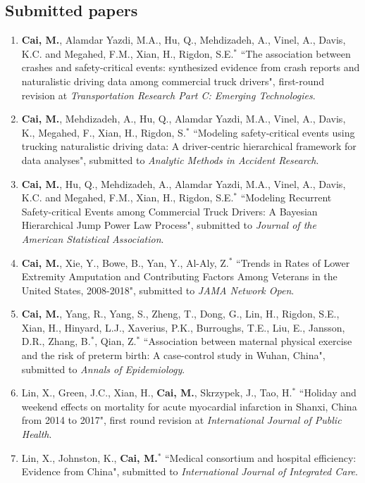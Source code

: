 \documentclass[11pt, a4paper]{article}
\begin{document}
	\subsection*{Submitted papers}
	\begin{enumerate}[leftmargin=0ex,itemsep=1ex]
		\item \textbf{Cai, M.}, Alamdar Yazdi, M.A., Hu, Q., Mehdizadeh, A., Vinel, A., Davis, K.C. and Megahed, F.M., Xian, H., Rigdon, S.E.$^\ast$ ``The association between crashes and safety-critical events: synthesized evidence from crash reports and naturalistic driving data among commercial truck drivers", first-round revision at \emph{Transportation Research Part C: Emerging Technologies}.
		
		\item \textbf{Cai, M.}, Mehdizadeh, A., Hu, Q., Alamdar Yazdi, M.A., Vinel, A., Davis, K., Megahed, F., Xian, H., Rigdon, S.$^\ast$ ``Modeling safety-critical events using trucking naturalistic driving data: A driver-centric hierarchical framework for data analyses", submitted to \emph{Analytic Methods in Accident Research}.
		
		\item \textbf{Cai, M.}, Hu, Q., Mehdizadeh, A., Alamdar Yazdi, M.A., Vinel, A., Davis, K.C. and Megahed, F.M., Xian, H., Rigdon, S.E.$^\ast$ ``Modeling Recurrent Safety-critical Events among Commercial Truck Drivers: A Bayesian Hierarchical Jump Power Law Process", submitted to \emph{Journal of the American Statistical Association}.
		
		\item \textbf{Cai, M.}, Xie, Y., Bowe, B., Yan, Y., Al-Aly, Z.$^\ast$ ``Trends in Rates of Lower Extremity Amputation and Contributing Factors Among Veterans in the United States, 2008-2018", submitted to \emph{JAMA Network Open}.
		
		\item \textbf{Cai, M.}, Yang, R., Yang, S., Zheng, T., Dong, G., Lin, H., Rigdon, S.E., Xian, H., Hinyard, L.J., Xaverius, P.K., Burroughs, T.E., Liu, E., Jansson, D.R., Zhang, B.$^\ast$, Qian, Z.$^\ast$ ``Association between maternal physical exercise and the risk of preterm birth: A case-control study in Wuhan, China", submitted to \emph{Annals of Epidemiology}.
		
		\item Lin, X., Green, J.C., Xian, H., \textbf{Cai, M.}, Skrzypek, J., Tao, H.$^\ast$ ``Holiday and weekend effects on mortality for acute myocardial infarction in Shanxi, China from 2014 to 2017", first round revision at \emph{International Journal of Public Health}.
		
		\item Lin, X., Johnston, K., \textbf{Cai, M.}$^*$ ``Medical consortium and hospital efficiency: Evidence from China", submitted to \emph{International Journal of Integrated Care}.
	\end{enumerate}
	
\end{document}
